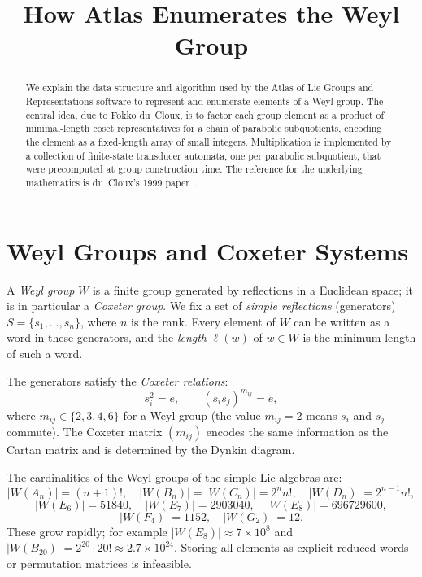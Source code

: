 \documentclass[12pt]{amsart}
\title{How Atlas Enumerates the Weyl Group}
\author{}
\date{}
\begin{document}
\begin{abstract}
We explain the data structure and algorithm used by the Atlas of Lie Groups and
Representations software to represent and enumerate elements of a Weyl group.
The central idea, due to Fokko du~Cloux, is to factor each group element as a
product of minimal-length coset representatives for a chain of parabolic
subquotients, encoding the element as a fixed-length array of small integers.
Multiplication is implemented by a collection of finite-state transducer
automata, one per parabolic subquotient, that were precomputed at group
construction time.  The reference for the underlying mathematics is du~Cloux's
1999 paper~\cite{duCloux1999}.
\end{abstract}

\maketitle

\tableofcontents

\section{Weyl Groups and Coxeter Systems}

A \emph{Weyl group} $W$ is a finite group generated by reflections in a
Euclidean space; it is in particular a \emph{Coxeter group}.  We fix a set of
\emph{simple reflections} (generators) $S = \{s_1, \ldots, s_n\}$, where $n$
is the rank.  Every element of $W$ can be written as a word in these generators,
and the \emph{length} $\ell(w)$ of $w \in W$ is the minimum length of such a
word.

The generators satisfy the \emph{Coxeter relations}:
\[
  s_i^2 = e, \qquad (s_i s_j)^{m_{ij}} = e,
\]
where $m_{ij} \in \{2,3,4,6\}$ for a Weyl group (the value $m_{ij}=2$ means
$s_i$ and $s_j$ commute).  The Coxeter matrix $(m_{ij})$ encodes the same
information as the Cartan matrix and is determined by the Dynkin diagram.

The cardinalities of the Weyl groups of the simple Lie algebras are:
\[
  |W(A_n)| = (n+1)!, \quad
  |W(B_n)| = |W(C_n)| = 2^n n!, \quad
  |W(D_n)| = 2^{n-1} n!,
\]
\[
  |W(E_6)| = 51840, \quad
  |W(E_7)| = 2903040, \quad
  |W(E_8)| = 696729600,
\]
\[
  |W(F_4)| = 1152, \quad
  |W(G_2)| = 12.
\]
These grow rapidly; for example $|W(E_8)| \approx 7 \times 10^8$ and
$|W(B_{20})| = 2^{20} \cdot 20! \approx 2.7 \times 10^{24}$.  Storing all
elements as explicit reduced words or permutation matrices is infeasible.
\end{document}
